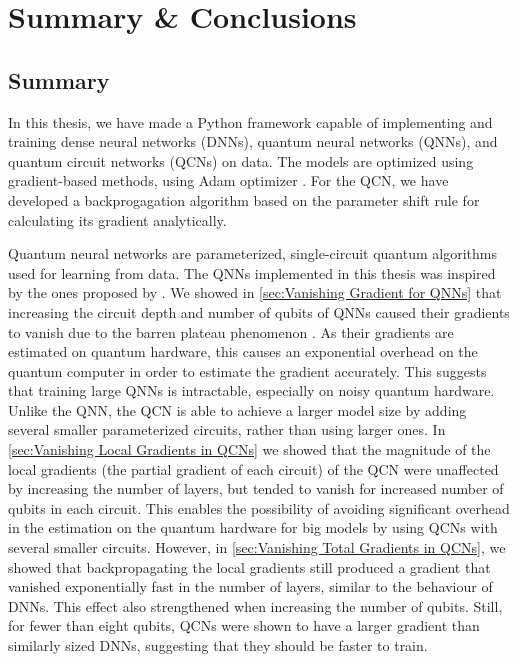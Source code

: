 \chapter{Summary \& Conclusions}\label{chap:Conclusion}

\section{Summary}\label{sec:Summary}
In this thesis, we have made a Python framework capable of implementing and training dense neural networks (DNNs), quantum neural networks (QNNs), and quantum circuit networks (QCNs) on data. The models are optimized using gradient-based methods, using Adam optimizer \cite{kingma2017adam}. For the QCN, we have developed a backprogagation algorithm based on the parameter shift rule for calculating its gradient analytically.

Quantum neural networks are parameterized, single-circuit quantum algorithms used for learning from data. The QNNs implemented in this thesis was inspired by the ones proposed by \citet{abbas2020power}. We showed in \cref{sec:Vanishing Gradient for QNNs} that increasing the circuit depth and number of qubits of QNNs caused their gradients to vanish due to the barren plateau phenomenon \cite{McClean_2018}. As their gradients are estimated on quantum hardware, this causes an exponential overhead on the quantum computer in order to estimate the gradient accurately. This suggests that training large QNNs is intractable, especially on noisy quantum hardware. Unlike the QNN, the QCN is able to achieve a larger model size by adding several smaller parameterized circuits, rather than using larger ones. In \cref{sec:Vanishing Local Gradients in QCNs} we showed that the magnitude of the local gradients (the partial gradient of each circuit) of the QCN were unaffected by increasing the number of layers, but tended to vanish for increased number of qubits in each circuit. This enables the possibility of avoiding significant overhead in the estimation on the quantum hardware for big models by using QCNs with several smaller circuits. However, in \cref{sec:Vanishing Total Gradients in QCNs}, we showed that backpropagating the local gradients still produced a gradient that vanished exponentially fast in the number of layers, similar to the behaviour of DNNs. This effect also strengthened when increasing the number of qubits. Still, for fewer than eight qubits, QCNs were shown to have a larger gradient than similarly sized DNNs, suggesting that they should be faster to train.

